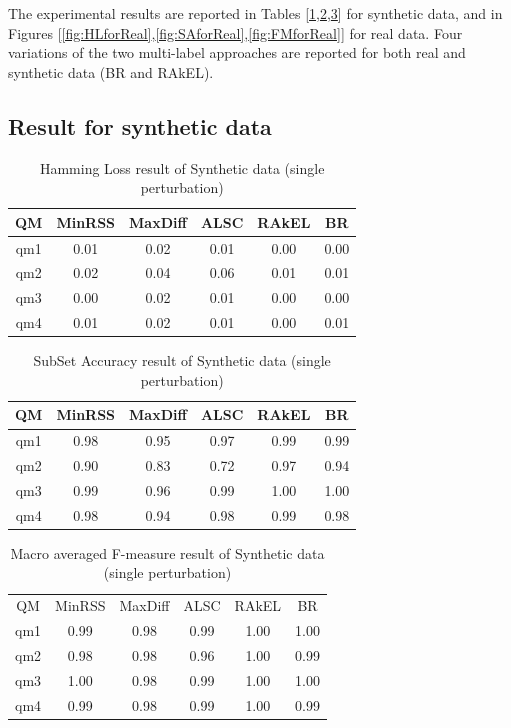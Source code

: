 \documentclass[11pt]{article}
\begin{document}
The experimental results are reported in Tables [\ref{ref:Syn_HL},\ref{ref:Syn_SA},\ref{ref:Syn_FM}] for synthetic data, and in  Figures [\ref{fig:HLforReal},\ref{fig:SAforReal},\ref{fig:FMforReal}] for real data. Four variations of the two multi-label approaches are reported for both real and synthetic data (BR and RAkEL).
\subsection{Result for synthetic data}



\begin {table}[h]
\scriptsize
\centering
\begin{tabular}{c|c|c|c|c|c}	
	\hline\hline	
QM & MinRSS & MaxDiff & ALSC & RAkEL & BR   \\ \hline
qm1 & 0.01 & 0.02 & 0.01 & 0.00 & 0.00 \\
qm2 & 0.02 & 0.04 & 0.06 & 0.01 & 0.01  \\
qm3 & 0.00 & 0.02 & 0.01 & 0.00 & 0.00   \\
qm4 & 0.01 & 0.02 & 0.01 & 0.00 & 0.01  \\  \hline\hline
\end{tabular}
\caption {Hamming Loss result of Synthetic data (single perturbation)} \label{ref:Syn_HL} 
\end{table}




\begin {table}[h]
\scriptsize
\centering
\begin{tabular}{c|c|c|c|c|c}	
	\hline\hline	
QM  & MinRSS  & MaxDiff  & ALSC  & RAkEL & BR    \\  \hline
qm1  & 0.98 & 0.95 & 0.97 & 0.99 & 0.99  \\
qm2  & 0.90 & 0.83 & 0.72 & 0.97 & 0.94  \\
qm3  & 0.99 & 0.96 & 0.99 & 1.00 & 1.00  \\
qm4  & 0.98 &  0.94 & 0.98 & 0.99 & 0.98  \\
\hline\hline
\end{tabular}
\caption {SubSet Accuracy result of Synthetic data (single perturbation)} \label{ref:Syn_SA} 
\end{table}



\begin {table}[h]
\scriptsize
\centering
\begin{tabular}{c|c|c|c|c|c}	
	\hline\hline	
 QM  &  MinRSS & MaxDiff  &  ALSC  &  RAkEL &  BR  \\ 
 qm1  & 0.99 & 0.98 & 0.99 & 1.00 & 1.00  \\  
 qm2  & 0.98 & 0.98 & 0.96 & 1.00 & 0.99  \\
 qm3  & 1.00 & 0.98 & 0.99 & 1.00 & 1.00  \\
 qm4  & 0.99 & 0.98 & 0.99 & 1.00 & 0.99  \\
\hline\hline
\end{tabular}
\caption {Macro averaged F-measure result of Synthetic data (single perturbation)} \label{ref:Syn_FM} 
\end{table}
\end{document}
